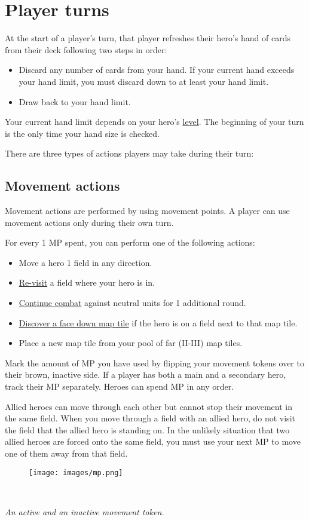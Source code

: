 \documentclass[12pt]{article}
\begin{document}
\clearpage

\section{Player turns}
At the start of a player’s turn, that player refreshes their hero's hand of cards from their deck following two steps in order:
\begin{itemize}
    \item Discard any number of cards from your hand. If your current hand exceeds your hand limit, you must discard down to at least your hand limit.
    \item Draw back to your hand limit.
\end{itemize}
Your current hand limit depends on your hero’s \hyperlink{Level}{level}. The beginning of your turn is the only time your hand size is checked.\par
There are three types of actions players may take during their turn:
\subsection*{Movement actions}
Movement actions are performed by using movement points. A player can use movement actions only during their own turn.\par
For every 1 MP spent, you can perform one of the following actions:
\begin{itemize}
    \item Move a hero 1 field in any direction.
    \item \hyperlink{Categories}{Re-visit} a field where your hero is in.
    \item \hyperlink{Timelimit}{Continue combat} against neutral units for 1 additional round.
    \item \hyperlink{Placing}{Discover a face down map tile} if the hero is on a field next to that map tile.
    \item Place a new map tile from your pool of far (II-III) map tiles.
\end{itemize}
Mark the amount of MP you have used by flipping your movement tokens over to their brown, inactive side. If a player has both a main and a secondary hero, track their MP separately. Heroes can spend MP in any order.\par
Allied heroes can move through each other but cannot stop their movement in the same field. When you move through a field with an allied hero, do not visit the field that the allied hero is standing on. In the unlikely situation that two allied heroes are forced onto the same field, you must use your next MP to move one of them away from that field.\par
\begin{figure}[h]
\centering
\texttt{[image: images/mp.png]}
\end{figure}\\
\begin{center}
\textit{An active and an inactive movement token.}
\end{center}
\end{document}
